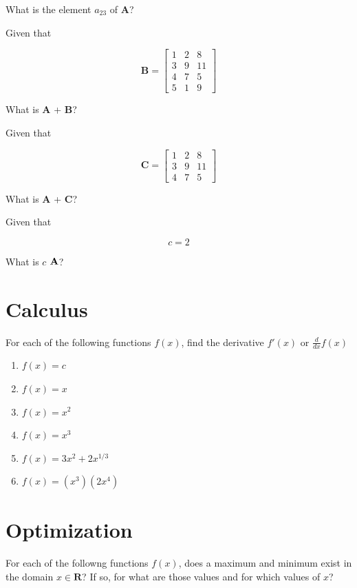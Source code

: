 \documentclass[
  letterpaper,
]{book}
\providecommand{\tightlist}{%
  \setlength{\itemsep}{0pt}\setlength{\parskip}{0pt}}\usepackage{longtable,booktabs,array}
\theoremstyle{definition}
\theoremstyle{definition}
\theoremstyle{plain}
\theoremstyle{definition}
\theoremstyle{plain}
\theoremstyle{plain}
\theoremstyle{remark}
\begin{document}
What is the element \(a_{23}\) of \(\mathbf{A}\)?

Given that

\[
\mathbf{B}
=
\begin{bmatrix}
    1 & 2 & 8 \\
    3 & 9 & 11 \\ 
    4 & 7 & 5 \\ 
    5 & 1 & 9
\end{bmatrix}
\]

What is \(\mathbf{A}\) + \(\mathbf{B}\)?

Given that

\[
\mathbf{C}=\begin{bmatrix}
            1 & 2 & 8 \\
            3 & 9 & 11 \\ 
            4 & 7 & 5 
        \end{bmatrix}
\]

What is \(\mathbf{A}\) + \(\mathbf{C}\)?

Given that

\[
c = 2
\]

What is \(c\) \({\bf A}\)?

\hypertarget{calculus}{%
\section*{Calculus}\label{calculus}}

For each of the following functions \(f(x)\), find the derivative
\(f'(x)\) or \(\frac{d}{dx}f(x)\)

\begin{enumerate}
\def\labelenumi{\arabic{enumi}.}
\tightlist
\item
  \(f(x)=c\)
\item
  \(f(x)=x\)
\item
  \(f(x)=x^2\)
\item
  \(f(x)=x^3\)
\item
  \(f(x)=3x^2+2x^{1/3}\)
\item
  \(f(x)=(x^3)(2x^4)\)
\end{enumerate}

\hypertarget{optimization}{%
\section*{Optimization}\label{optimization}}

For each of the followng functions \(f(x)\), does a maximum and minimum
exist in the domain \(x \in \mathbf{R}\)? If so, for what are those
values and for which values of \(x\)?
\end{document}
